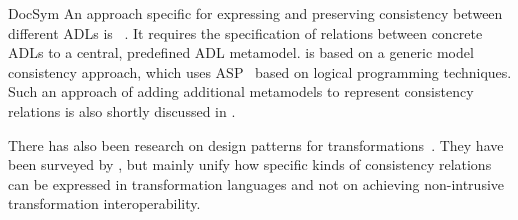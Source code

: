 \begin{copiedFrom}{DocSym}
An approach specific for expressing and preserving consistency between different \glspl{ADL} is \dually~\cite{malavolta2010ADLInteroperability-TSE,eramo2012Dually-SoSym}. 
It requires the specification of relations between concrete \glspl{ADL} to a central, predefined \gls{ADL} metamodel.
\dually is based on a generic model consistency approach, which uses \gls{ASP}~\cite{cicchetti2006a,eramo2008a} based on logical programming techniques. %
Such an approach of adding additional metamodels to represent consistency relations is also shortly discussed in \cite{stevens2020BidirectionalTransformationLarge-SoSym}. %

There has also been research on design patterns for transformations~\cite{iacob2008a, lano2014a}.
They have been surveyed by \textcite{lano2018a}, but mainly unify how specific kinds of consistency relations can be expressed in transformation languages and not on achieving non-intrusive transformation interoperability.



\end{copiedFrom}
